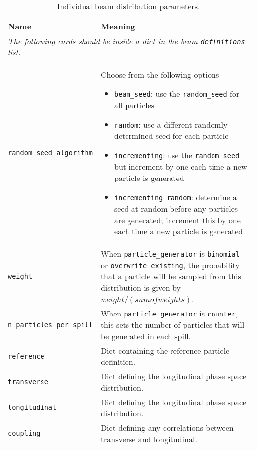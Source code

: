 \begin{table*}
\begin{center}
\caption{Individual beam distribution parameters.}
\begin{tabularx}{\linewidth}{lX}
Name & Meaning \\
\hline
\multicolumn{2}{l}{\emph{The following cards should be inside a dict in the beam \verb|definitions| list.}} \\
\hline
\verb|random_seed_algorithm| & Choose from the following options
                          \begin{itemize}
                            \setlength{\itemsep}{0mm}
                            \item \verb|beam_seed|: use the \verb|random_seed| for all particles
                            \item \verb|random|: use a different randomly determined seed for each particle
                            \item \verb|incrementing|: use the \verb|random_seed| but increment by one each time a new particle is generated
                            \item \verb|incrementing_random|: determine a seed at random before any particles are generated; increment this by one each time a new particle is generated
                          \end{itemize}\\
\verb|weight| & When \verb|particle_generator| is \verb|binomial| or \verb|overwrite_existing|, the probability that a particle will be sampled from this distribution is given by $weight/(sumofweights)$.\\
\verb|n_particles_per_spill| & When \verb|particle_generator| is \verb|counter|, this sets the number of particles that will be generated in each spill. \\
\verb|reference| & Dict containing the reference particle definition. \\
\verb|transverse| & Dict defining the longitudinal phase space distribution. \\
\verb|longitudinal| & Dict defining the longitudinal phase space distribution. \\
\verb|coupling| & Dict defining any correlations between transverse and longitudinal. \\
\end{tabularx}
\end{center}
\end{table*}

